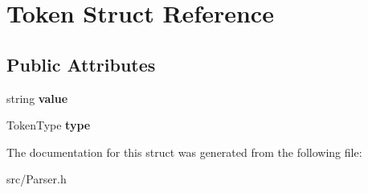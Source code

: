 \hypertarget{struct_token}{\section{Token Struct Reference}
\label{struct_token}
}
\subsection*{Public Attributes}
\begin{DoxyCompactItemize}
\item 
\hypertarget{struct_token_a2aba86042caecc62787c3ad63682f5c7}{string {\bfseries value}}\label{struct_token_a2aba86042caecc62787c3ad63682f5c7}

\item 
\hypertarget{struct_token_a67919af9f3a80dc0b28a0ab1e6d5bf8a}{Token\-Type {\bfseries type}}\label{struct_token_a67919af9f3a80dc0b28a0ab1e6d5bf8a}

\end{DoxyCompactItemize}


The documentation for this struct was generated from the following file\-:\begin{DoxyCompactItemize}
\item 
src/Parser.\-h\end{DoxyCompactItemize}
